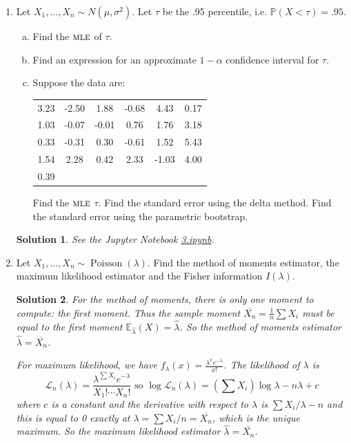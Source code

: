 \documentclass[10pt]{article}
\newtheorem*{sol}{Solution}
\renewcommand{\P}{\mathbb{P}}
\newcommand{\E}{\mathbb{E}}
\newcommand{\Poiss}{\operatorname{Poisson}}
\newcommand{\MLE}{\textsc{mle}}
\begin{document}
\begin{enumerate}
\item[(3)] Let $X_1,\ldots,X_n\sim N(\mu,\sigma^2)$. Let $\tau$ be the .95 percentile,
i.e. $\P(X<\tau) = .95$.
\begin{enumerate}[(a)]
\item Find the $\MLE$ of $\tau$.
\item Find an expression for an approximate $1-\alpha$ confidence interval for
$\tau$.
\item Suppose the data are:
\begin{center}
\begin{tabular}{c c c c c c}
3.23&-2.50&1.88&-0.68&4.43&0.17 \\
1.03&-0.07&-0.01&0.76&1.76&3.18 \\
0.33&-0.31&0.30&-0.61&1.52&5.43 \\
1.54&2.28&0.42&2.33&-1.03&4.00 \\
0.39 &&&&&
\end{tabular}
\end{center}

Find the $\MLE$ $\tau$. Find the standard error using the delta method. Find
the standard error using the parametric bootstrap.
\end{enumerate}

\begin{sol}
See the Jupyter Notebook
\href{https://github.com/ajrasmus/some_of_statistics/blob/main/chapter_9/3.ipynb}{3.ipynb}.
\end{sol}

\item[(5)] Let $X_1,\ldots,X_n\sim \Poiss(\lambda)$. Find the method of moments estimator,
the maximum likelihood estimator and the Fisher information $I(\lambda)$.

\begin{sol}
For the method of moments, there is only one moment to compute: the first moment.
Thus the sample moment $\overline{X_n}=\frac{1}{n}\sum X_i$ must be equal to
the first moment $\E_{\hat\lambda}(X)=\hat\lambda$. So the method of moments
estimator $\hat\lambda = \overline{X_n}$.

For maximum likelihood, we have $f_{\lambda}(x)=\frac{\lambda^x e^{-\lambda}}{x!}$.
The likelihood of $\lambda$ is
\[
\mathcal L_n(\lambda) =\frac{\lambda^{\sum X_i} e^{-\lambda}}{X_1! \cdots X_n!}
\text{ so }
\log \mathcal L_n(\lambda)= \left(\sum X_i\right)\log \lambda - n\lambda + c
\]
where $c$ is a constant and the derivative with respect to $\lambda$ is
$\sum X_i/\lambda-n$ and this is equal to 0 exactly at
$\lambda=\sum X_i/n = \overline{X_n}$, which is the unique maximum. So
the maximum likelihood estimator $\hat\lambda = \overline{X_n}$.


\end{sol}
\end{enumerate}
\end{document}
